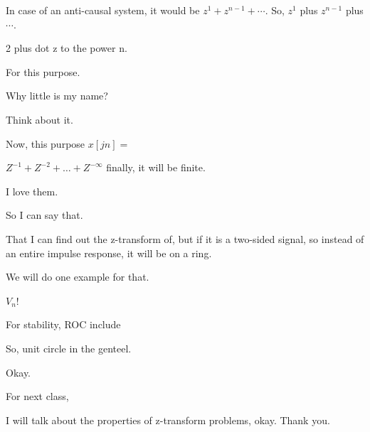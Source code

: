 \documentclass{article}
\begin{document}


In case of an anti-causal system, it would be $z^1 + z^{n-1} + \cdots$. So, $z^1$ plus $z^{n-1}$ plus $\cdots$.

2 plus dot z to the power n.

For this purpose.

Why little is my name?

Think about it.

Now, this purpose $x[jn] =$

$Z^{-1} + Z^{-2} + \ldots + Z^{-\infty}$ finally, it will be finite.











I love them.

So I can say that.

That I can find out the z-transform of, but if it is a two-sided signal, so instead of an entire impulse response, it will be on a ring.







We will do one example for that.

$V_n!$



For stability, ROC include

So, unit circle in the genteel.

Okay.

For next class,

I will talk about the properties of z-transform problems, okay. Thank you.



\end{document}
